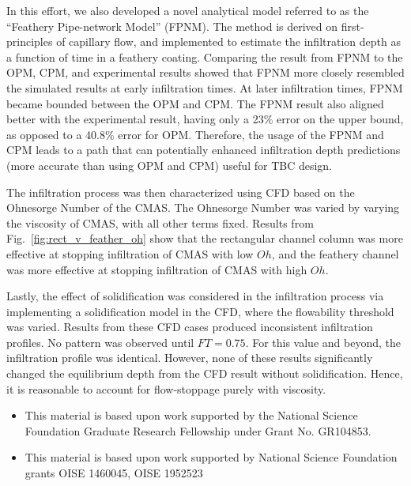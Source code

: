 \documentclass[%
 aip,
 amsmath,amssymb,
 reprint,%
]{revtex4-1}
\begin{document}
In this effort, we also developed a novel analytical model referred to as the ``Feathery Pipe-network Model'' (FPNM). The method is derived on first-principles of capillary flow, and implemented to estimate the infiltration depth as a function of time in a feathery coating.
Comparing the result from FPNM to the OPM, CPM, and experimental results showed that FPNM more closely resembled the simulated results at early infiltration times.
At later infiltration times, FPNM became bounded between the OPM and CPM. 
The FPNM result also aligned better with the experimental result, having only a 23\% error on the upper bound, as opposed to a 40.8\% error for OPM. 
Therefore, the usage of the FPNM and CPM leads to a path that can potentially enhanced infiltration depth predictions (more accurate than using OPM and CPM) useful for TBC design. 



The infiltration process was then characterized using CFD based on the Ohnesorge Number of the CMAS. 
The Ohnesorge Number was varied by varying the viscosity of CMAS, with all other terms fixed. 
Results from Fig.~\ref{fig:rect_v_feather_oh} show that the rectangular channel column was more effective at stopping infiltration of CMAS with low $Oh$, and the feathery channel was more effective at stopping infiltration of CMAS with high $Oh$.

Lastly, the effect of solidification was considered in the infiltration process via implementing a solidification model in the CFD, where the flowability threshold was varied. 
Results from these CFD cases produced inconsistent infiltration profiles. 
No pattern was observed until $FT=0.75$. 
For this value and beyond, the infiltration profile was identical.
However, none of these results significantly changed the equilibrium depth from the CFD result without solidification.
Hence, it is reasonable to account for flow-stoppage purely with viscosity.

\begin{acknowledgments}
\begin{itemize}
\item This material is based upon work supported 
by the National Science Foundation 
Graduate Research Fellowship under Grant 
No. GR104853.
\item This material is based upon work supported 
by National Science Foundation grants OISE 
1460045, OISE 1952523
\end{itemize}
\end{acknowledgments}
\end{document}
